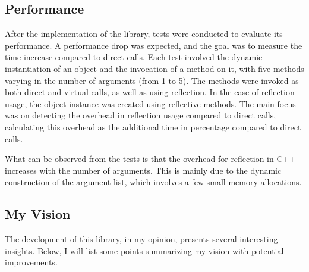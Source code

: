 \documentclass[11pt]{article}
\begin{document}
\begin{multicols*}{2}[\columnsep=1cm]
    \subsection{Performance}
    After the implementation of the library, tests were conducted to evaluate its performance. A performance drop was expected, and the goal was to measure the time increase compared to direct calls. Each test involved the dynamic instantiation of an object and the invocation of a method on it, with five methods varying in the number of arguments (from 1 to 5). The methods were invoked as both direct and virtual calls, as well as using reflection. In the case of reflection usage, the object instance was created using reflective methods. The main focus was on detecting the overhead in reflection usage compared to direct calls, calculating this overhead as the additional time in percentage compared to direct calls.
    
    What can be observed from the tests is that the overhead for reflection in C++ increases with the number of arguments. This is mainly due to the dynamic construction of the argument list, which involves a few small memory allocations.
    
    \subsection{My Vision}
    The development of this library, in my opinion, presents several interesting insights. Below, I will list some points summarizing my vision with potential improvements.
    

\end{multicols*}
\end{document}
